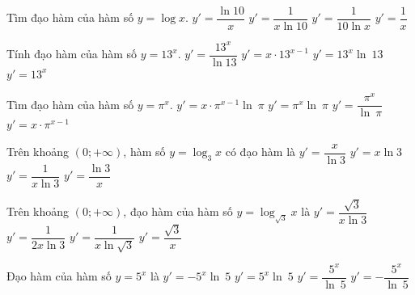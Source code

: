 \begin{ex}%
	 Tìm đạo hàm của hàm số $y=\log x$.
	 \choice
		 {$y'=\dfrac{\ln 10}{x}$}
		{\True $y'=\dfrac{1}{x\ln 10}$} 
		{$y'=\dfrac{1}{10\ln x}$} 
		 {$y'=\dfrac{1}{x}$}
\end{ex}

\begin{ex}%
	 Tính đạo hàm của hàm số $y=13^{x}$.
	\choice 
		{$y'=\dfrac{13^{x}}{\ln13}$} 
		{$y'=x  \cdot 13^{x-1}$}
		 {\True $y'=13^{x}\ln~13$}
		{$y'=13^{x}$} 
\end{ex}

\begin{ex}%
	Tìm đạo hàm của hàm số  $y=\pi^{x}$.
	\choice 
		 {$y'=x \cdot \pi^{x-1}\ln~\pi$}
		{\True $y'=\pi^{x}\ln~\pi$} 
		 {$y'=\dfrac{\pi^{x}}{\ln~\pi}$}
		{$y'=x \cdot \pi^{x-1}$} 
\end{ex}

\begin{ex}%
	Trên khoảng $(0;+\infty)$, hàm số $y=\log_3  x$ có đạo hàm là
	 \choice
		{$y'=\dfrac{x}{\ln 3}$} 
		{$y'=x\ln  3$}
		{\True $y'=\dfrac{1}{x\ln 3}$} 
		 {$y'=\dfrac{\ln 3}{x}$}
\end{ex}

\begin{ex}%
	Trên khoảng $(0;+\infty)$, đạo hàm của hàm số $y=\log _{\sqrt{3}}  x$ là
	 \choice
		{$y'=\dfrac{\sqrt{3}}{x\ln 3}$} 
		{$y'=\dfrac{1}{2x\ln 3}$} 
		{\True  $y'=\dfrac{1}{x\ln \sqrt{3}}$}
		{$y'=\dfrac{\sqrt{3}}{x}$} 
\end{ex}

\begin{ex}%
	Đạo hàm của hàm số  $y=5^{x}$ là
	\choice 
		{$y'=-5^{x}\ln~5$} 
		{\True  $y'=5^{x}\ln~5$}
		 {$y'=\dfrac{5^{x}}{\ln~5}$}
		 {$y'=-\dfrac{5^{x}}{\ln~5}$}
\end{ex}

